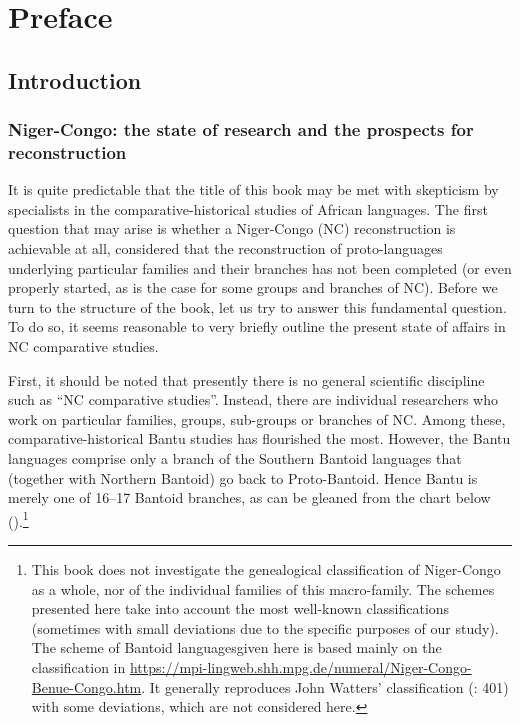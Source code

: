 \chapter{Preface}
\section{Introduction}
\subsection{Niger-Congo: the state of research and the prospects for reconstruction} 

It is quite predictable that the title of this book may be met with skepticism by specialists in the comparative-historical studies of African languages. The first question that may arise is whether a Niger-Congo (NC) reconstruction is achievable at all, considered that the reconstruction of proto-languages underlying particular families and their branches has not been completed (or even properly started, as is the case for some groups and branches of NC). Before we turn to the structure of the book, let us try to answer this fundamental question. To do so, it seems reasonable to very briefly outline the present state of affairs in NC comparative studies. 

First, it should be noted that presently there is no general scientific discipline such as “NC comparative studies”. Instead, there are individual researchers who work on particular families, groups, sub-groups or branches of NC. Among these, comparative-historical Bantu studies has flourished the most. However, the Bantu languages comprise only a branch of the Southern Bantoid languages that (together with Northern Bantoid) go back to Proto-Bantoid. Hence Bantu is merely one of 16--17 Bantoid branches, as can be gleaned from the chart below ().\footnote{This book does not investigate the genealogical classification of Niger-Congo as a whole, nor of the individual families of this macro-family. The schemes presented here take into account the most well-known classifications (sometimes with small deviations due to the specific purposes of our study). The scheme of Bantoid languages ​​given here is based mainly on the classification in \url{https://mpi-lingweb.shh.mpg.de/numeral/Niger-Congo-Benue-Congo.htm}. It generally reproduces John Watters' classification (\citeyear{Watters1989}: 401) with some deviations, which are not considered here.}

